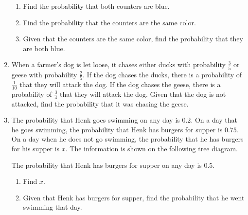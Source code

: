 \begin{enumerate}
\begin{enumerate}
	\item Find the probability that both counters are blue.
	\item Find the probability that the counters are the same color.
	\item Given that the counters are the same color, find the probability that they are both blue.
\end{enumerate} 
	
	
	
	\item When a farmer's dog is let loose, it chases either ducks with probability $\frac{3}{5}$ or geese with probability $\frac{2}{5}$. If the dog chases the ducks, there is a probability of $\frac{1}{10}$ that they will attack the dog. If the dog chases the geese, there is a probability of $\frac{3}{4}$ that they will attack the dog. Given that the dog is not attacked, find the probability that it was chasing the geese. 
	
	
	\item  The probability that Henk goes swimming on any day is $0.2$. On a day that he goes swimming, the probability that Henk has burgers for supper is $0.75$. On a day when he does not go swimming, the probability that he has burgers for his supper is $x$.  The information is shown on the following tree diagram.
	
	\begin{figure*}[!htpb]
		\centering
	\end{figure*}
	
	The probability that Henk has burgers for supper on any day is $0.5$.
	\begin{enumerate}
		\item Find $x$.
		\item Given that Henk has burgers for supper, find the probability that he went swimming that day.
	\end{enumerate}
	

\end{enumerate}
